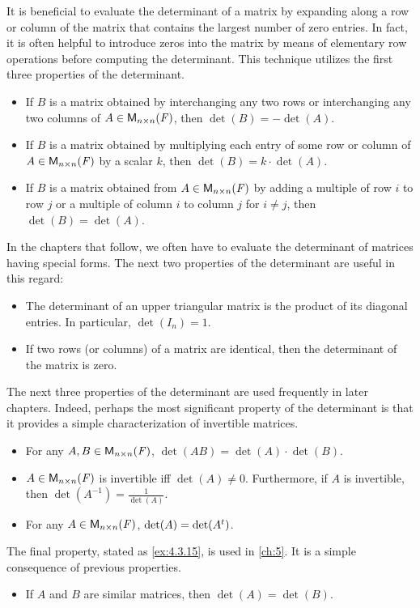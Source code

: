 \begin{note}
	It is beneficial to evaluate the determinant of a matrix by expanding along a row or column of the matrix that contains the largest number of zero entries.
	In fact, it is often helpful to introduce zeros into the matrix by means of elementary row operations before computing the determinant.
	This technique utilizes the first three properties of the determinant.
	\begin{itemize}
		\item If \(B\) is a matrix obtained by interchanging any two rows or interchanging any two columns of \(A \in \ms[n][n][\F]\), then \(\det(B) = -\det(A)\).
		\item If \(B\) is a matrix obtained by multiplying each entry of some row or column of \(A \in \ms[n][n][\F]\) by a scalar \(k\), then \(\det(B) = k \cdot \det(A)\).
		\item If \(B\) is a matrix obtained from \(A \in \ms[n][n][\F]\) by adding a multiple of row \(i\) to row \(j\) or a multiple of column \(i\) to column \(j\) for \(i \neq j\), then \(\det(B) = \det(A)\).
	\end{itemize}
	In the chapters that follow, we often have to evaluate the determinant of matrices having special forms.
	The next two properties of the determinant are useful in this regard:
	\begin{itemize}
		\item The determinant of an upper triangular matrix is the product of its diagonal entries.
		      In particular, \(\det(I_n) = 1\).
		\item If two rows (or columns) of a matrix are identical, then the determinant of the matrix is zero.
	\end{itemize}
	The next three properties of the determinant are used frequently in later chapters.
	Indeed, perhaps the most significant property of the determinant is that it provides a simple characterization of invertible matrices.
	\begin{itemize}
		\item For any \(A, B \in \ms[n][n][\F]\), \(\det(AB) = \det(A) \cdot \det(B)\).
		\item \(A \in \ms[n][n][\F]\) is invertible iff \(\det(A) \neq 0\).
		      Furthermore, if \(A\) is invertible, then \(\det(A^{-1}) = \frac{1}{\det(A)}\).
		\item For any \(A \in \ms[n][n][\F]\), \(\det(A) = \det({A}^{t})\).
	\end{itemize}
	The final property, stated as \cref{ex:4.3.15}, is used in \cref{ch:5}.
	It is a simple consequence of previous properties.
	\begin{itemize}
		\item If \(A\) and \(B\) are similar matrices, then \(\det(A) = \det(B)\).
	\end{itemize}
\end{note}

